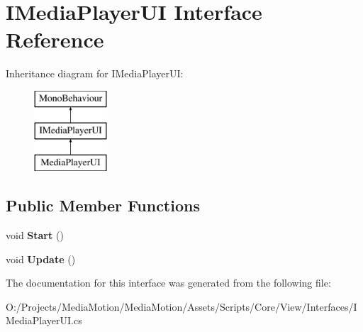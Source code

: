 \hypertarget{interface_i_media_player_u_i}{\section{I\+Media\+Player\+U\+I Interface Reference}
\label{interface_i_media_player_u_i}
}
Inheritance diagram for I\+Media\+Player\+U\+I\+:\begin{figure}[H]
\begin{center}
\leavevmode
\includegraphics[height=3.000000cm]{interface_i_media_player_u_i}
\end{center}
\end{figure}
\subsection*{Public Member Functions}
\begin{DoxyCompactItemize}
\item 
\hypertarget{interface_i_media_player_u_i_a898b5baebda60dc04aa438d3aabdfd39}{void {\bfseries Start} ()}\label{interface_i_media_player_u_i_a898b5baebda60dc04aa438d3aabdfd39}

\item 
\hypertarget{interface_i_media_player_u_i_a6298eddbf7ac7d81f517c7f4c2e652f7}{void {\bfseries Update} ()}\label{interface_i_media_player_u_i_a6298eddbf7ac7d81f517c7f4c2e652f7}

\end{DoxyCompactItemize}


The documentation for this interface was generated from the following file\+:\begin{DoxyCompactItemize}
\item 
O\+:/\+Projects/\+Media\+Motion/\+Media\+Motion/\+Assets/\+Scripts/\+Core/\+View/\+Interfaces/I\+Media\+Player\+U\+I.\+cs\end{DoxyCompactItemize}
